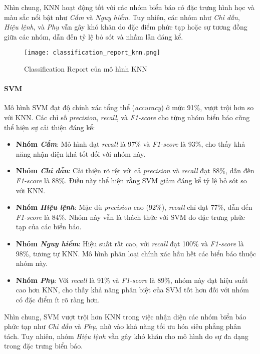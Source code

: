 \documentclass[a4paper,12pt]{article}
\begin{document}
Nhìn chung, KNN hoạt động tốt với các nhóm biển báo có đặc trưng hình học và màu sắc nổi bật như \textit{Cấm} và \textit{Nguy hiểm}. Tuy nhiên, các nhóm như \textit{Chỉ dẫn}, \textit{Hiệu lệnh}, và \textit{Phụ} vẫn gây khó khăn do đặc điểm phức tạp hoặc sự tương đồng giữa các nhóm, dẫn đến tỷ lệ bỏ sót và nhầm lẫn đáng kể.

\begin{figure}[H]
    \centering
    \texttt{[image: classification\_report\_knn.png]}
    \caption{Classification Report của mô hình KNN}
    \label{fig:knn_classification_report}
\end{figure}

\paragraph{SVM}
Mô hình SVM đạt độ chính xác tổng thể (\textit{accuracy}) ở mức 91\%, vượt trội hơn so với KNN. Các chỉ số \textit{precision}, \textit{recall}, và \textit{F1-score} cho từng nhóm biển báo cũng thể hiện sự cải thiện đáng kể:
\begin{itemize} \item \textbf{Nhóm \textit{Cấm}}: Mô hình đạt \textit{recall} là 97\% và \textit{F1-score} là 93\%, cho thấy khả năng nhận diện khá tốt đối với nhóm này.
\item \textbf{Nhóm \textit{Chỉ dẫn}}: Cải thiện rõ rệt với cả \textit{precision} và \textit{recall} đạt 88\%, dẫn đến \textit{F1-score} là 88\%. Điều này thể hiện rằng SVM giảm đáng kể tỷ lệ bỏ sót so với KNN.
\item \textbf{Nhóm \textit{Hiệu lệnh}}: Mặc dù \textit{precision} cao (92\%), \textit{recall} chỉ đạt 77\%, dẫn đến \textit{F1-score} là 84\%. Nhóm này vẫn là thách thức với SVM do đặc trưng phức tạp của các biển báo.
\item \textbf{Nhóm \textit{Nguy hiểm}}: Hiệu suất rất cao, với \textit{recall} đạt 100\% và \textit{F1-score} là 98\%, tương tự KNN. Mô hình phân loại chính xác hầu hết các biển báo thuộc nhóm này.
\item \textbf{Nhóm \textit{Phụ}}: Với \textit{recall} là 91\% và \textit{F1-score} là 89\%, nhóm này đạt hiệu suất cao hơn KNN, cho thấy khả năng phân biệt của SVM tốt hơn đối với nhóm có đặc điểm ít rõ ràng hơn.
\end{itemize}

Nhìn chung, SVM vượt trội hơn KNN trong việc nhận diện các nhóm biển báo phức tạp như \textit{Chỉ dẫn} và \textit{Phụ}, nhờ vào khả năng tối ưu hóa siêu phẳng phân tách. Tuy nhiên, nhóm \textit{Hiệu lệnh} vẫn gây khó khăn cho mô hình do sự đa dạng trong đặc trưng biển báo.
\end{document}
